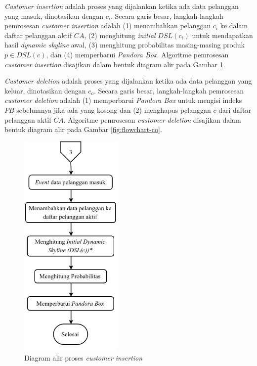 
\textit{Customer insertion} adalah proses yang dijalankan ketika ada data pelanggan yang masuk, dinotasikan dengan $c_{i}$. Secara garis besar, langkah-langkah pemrosesan \textit{customer insertion} adalah (1) menambahkan pelanggan $c_{i}$ ke dalam daftar pelanggan aktif $CA$, (2) menghitung \textit{initial} $DSL(c_{i})$ untuk mendapatkan hasil \textit{dynamic skyline} awal, (3) menghitung probabilitas masing-masing produk $p \in DSL(c)$, dan (4) memperbarui \textit{Pandora Box}. Algoritme pemrosesan \textit{customer insertion} disajikan dalam bentuk diagram alir pada Gambar \ref{fig:flowchart-ci}.


\textit{Customer deletion} adalah proses yang dijalankan ketika ada data pelanggan yang keluar, dinotasikan dengan $c_{o}$. Secara garis besar, langkah-langkah pemrosesan \textit{customer deletion} adalah (1) memperbarui \textit{Pandora Box} untuk mengisi indeks $PB$ sebelumnya jika ada yang kosong dan (2) menghapus pelanggan $c$ dari daftar pelanggan aktif $CA$. Algoritme pemrosesan \textit{customer deletion} disajikan dalam bentuk diagram alir pada Gambar \ref{fig:flowchart-co}. 

\begin{figure}[H]
	\centering
	\includegraphics[width=5cm]{assets/img/bab3/flowchart-ci.png}
	\caption{Diagram alir proses \textit{customer insertion}}
	\label{fig:flowchart-ci}
\end{figure}

